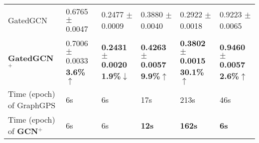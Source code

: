 \begin{table*}[t]
{\begin{tabular}{l|lllll}
        \midrule %
        GatedGCN & 0.6765{\tiny{ $\pm$ 0.0047}} &0.2477{\tiny{ $\pm$ 0.0009}} & 0.3880{\tiny{ $\pm$ 0.0040}} &0.2922{\tiny{ $\pm$ 0.0018}}& 0.9223{\tiny{ $\pm$ 0.0065}}  \\
        \rowcolor{gray!20}
        \textbf{GatedGCN$^+$} & 0.7006{\tiny{ $\pm$ 0.0033}} \textbf{3.6\%$\uparrow$} & \textbf{\textcolor{darkorange!90}{0.2431{\tiny{ $\pm$ 0.0020}}}} \textbf{1.9\%$\downarrow$} & \textbf{\textcolor{darkorange!90}{0.4263{\tiny{ $\pm$ 0.0057}}}} \textbf{9.9\%$\uparrow$} & \textbf{\textcolor{darkorange!90}{0.3802{\tiny{ $\pm$ 0.0015}}}} \textbf{30.1\%$\uparrow$} & \textbf{\textcolor{customcyan}{0.9460{\tiny{ $\pm$ 0.0057}}}} \textbf{2.6\%$\uparrow$} \\ 
        \midrule %
        Time (epoch) of GraphGPS & 6s & 6s & 17s & 213s & 46s \\
        \rowcolor{gray!20}
        Time (epoch) of  \textbf{GCN$^+$} & 6s & 6s & \textbf{12s} & \textbf{162s} & \textbf{6s}  \\
        \bottomrule
	\end{tabular}}
	\label{tab:tab3}
\end{table*}

